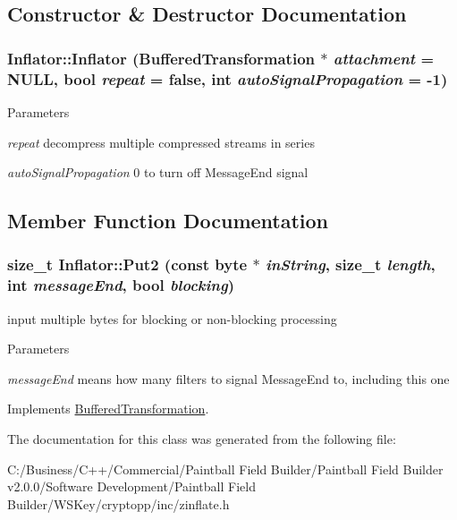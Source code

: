\subsection{Constructor \& Destructor Documentation}
\hypertarget{class_inflator_a525a109323ed6dfb57be3a06e44fb93e}{
\subsubsection[{Inflator}]{\setlength{\rightskip}{0pt plus 5cm}Inflator::Inflator ({\bf BufferedTransformation} $\ast$ {\em attachment} = {\ttfamily NULL}, \/  bool {\em repeat} = {\ttfamily false}, \/  int {\em autoSignalPropagation} = {\ttfamily -\/1})}}
\label{class_inflator_a525a109323ed6dfb57be3a06e44fb93e}

\begin{DoxyParams}{Parameters}
\item[{\em repeat}]decompress multiple compressed streams in series \item[{\em autoSignalPropagation}]0 to turn off MessageEnd signal \end{DoxyParams}


\subsection{Member Function Documentation}
\hypertarget{class_inflator_aeb7d602a16d9263b25b96030aa5583ec}{
\subsubsection[{Put2}]{\setlength{\rightskip}{0pt plus 5cm}size\_\-t Inflator::Put2 (const byte $\ast$ {\em inString}, \/  size\_\-t {\em length}, \/  int {\em messageEnd}, \/  bool {\em blocking})}}
\label{class_inflator_aeb7d602a16d9263b25b96030aa5583ec}


input multiple bytes for blocking or non-\/blocking processing 
\begin{DoxyParams}{Parameters}
\item[{\em messageEnd}]means how many filters to signal MessageEnd to, including this one \end{DoxyParams}


Implements \hyperlink{class_buffered_transformation_ad396dcb42260f23125a35ec0e5d17d55}{BufferedTransformation}.

The documentation for this class was generated from the following file:\begin{DoxyCompactItemize}
\item 
C:/Business/C++/Commercial/Paintball Field Builder/Paintball Field Builder v2.0.0/Software Development/Paintball Field Builder/WSKey/cryptopp/inc/zinflate.h\end{DoxyCompactItemize}
